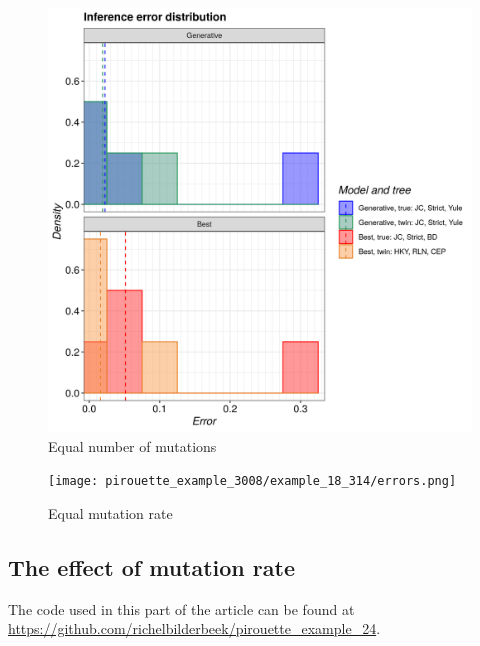 \begin{figure}[H]
  \includegraphics[width=\textwidth]{pirouette_example_30/example_30_314/errors.png}
  \caption{Equal number of mutations}
\end{figure}

\begin{figure}[H]
  \texttt{[image: pirouette\_example\_3008/example\_18\_314/errors.png]}
  \caption{Equal mutation rate}
\end{figure}

\subsection{The effect of mutation rate}

The code used in this part of the article can be found at 
\url{https://github.com/richelbilderbeek/pirouette_example_24}.

